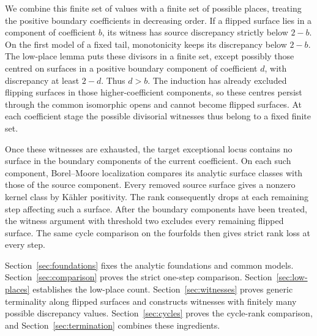 We combine this finite set of values with a finite set of possible
places, treating the positive boundary coefficients in decreasing
order. If a flipped surface lies in a component of coefficient $b$,
its witness has source discrepancy strictly below $2-b$.
On the first model of a fixed tail, monotonicity keeps its discrepancy
below $2-b$. The low-place lemma puts these divisors in a finite set,
except possibly those centred on surfaces in a positive boundary
component of coefficient $d$, with discrepancy at least $2-d$. Thus $d>b$.
The induction has already
excluded flipping surfaces in those higher-coefficient components,
so these centres persist through the common isomorphic opens and
cannot become flipped surfaces. At each coefficient stage the
possible divisorial witnesses thus belong to a fixed finite set.

Once these witnesses are exhausted, the target exceptional locus
contains no surface in the boundary components of the current
coefficient. On each such component,
Borel--Moore localization compares
its analytic surface classes with those of the source component.
Every removed source surface gives a nonzero kernel class by
K\"ahler positivity. The rank consequently drops at each remaining
step affecting such a surface. After the boundary components have
been treated, the witness argument with threshold two excludes every
remaining flipped surface. The same cycle comparison on the fourfolds
then gives strict rank loss at every step.

Section~\ref{sec:foundations} fixes the analytic foundations and
common models. Section~\ref{sec:comparison} proves the strict
one-step comparison. Section~\ref{sec:low-places} establishes the
low-place count. Section~\ref{sec:witnesses} proves generic
terminality along flipped surfaces and constructs witnesses with
finitely many possible discrepancy values. Section~\ref{sec:cycles} proves the
cycle-rank comparison, and Section~\ref{sec:termination} combines
these ingredients.

